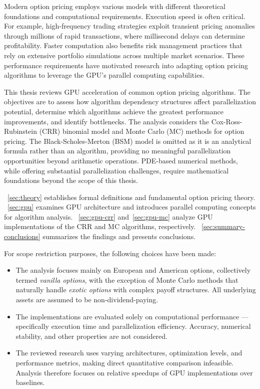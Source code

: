 \documentclass[english,12pt,a4paper,pdftex,sci,utf8]{aaltothesis}
\begin{document}
Modern option pricing employs various models with different theoretical foundations and computational requirements. Execution speed is often critical. For example, high-frequency trading strategies exploit transient pricing anomalies through millions of rapid transactions, where millisecond delays can determine profitability. Faster computation also benefits risk management practices that rely on extensive portfolio simulations across multiple market scenarios. These performance requirements have motivated research into adapting option pricing algorithms to leverage the GPU's parallel computing capabilities.

This thesis reviews GPU acceleration of common option pricing algorithms. The objectives are to assess how algorithm dependency structures affect parallelization potential, determine which algorithms achieve the greatest performance improvements, and identify bottlenecks. The analysis considers the Cox-Ross-Rubinstein (CRR) binomial model and Monte Carlo (MC) methods for option pricing. The Black-Scholes-Merton (BSM) model is omitted as it is an analytical formula rather than an algorithm, providing no meaningful parallelization opportunities beyond arithmetic operations. PDE-based numerical methods, while offering substantial parallelization challenges, require mathematical foundations beyond the scope of this thesis.

~\cref{sec:theory} establishes formal definitions and fundamental option pricing theory. ~\cref{sec:gpu} examines GPU architecture and introduces parallel computing concepts for algorithm analysis. ~\cref{sec:gpu-crr} and~\cref{sec:gpu-mc} analyze GPU implementations of the CRR and MC algorithms, respectively. ~\cref{sec:summary-conclusions} summarizes the findings and presents conclusions.

For scope restriction purposes, the following choices have been made:
\begin{itemize}\setlength\itemsep{0.1em}
\item The analysis focuses mainly on European and American options, collectively termed \emph{vanilla options}, with the exception of Monte Carlo methods that naturally handle \emph{exotic options} with complex payoff structures. All underlying assets are assumed to be non-dividend-paying.
    
\item The implementations are evaluated solely on computational performance --- specifically execution time and parallelization efficiency. Accuracy, numerical stability, and other properties are not considered.

\item The reviewed research uses varying architectures, optimization levels, and performance metrics, making direct quantitative comparison infeasible. \mbox{Analysis} therefore focuses on relative speedups of GPU implementations over baselines.
\end{itemize}
\end{document}
